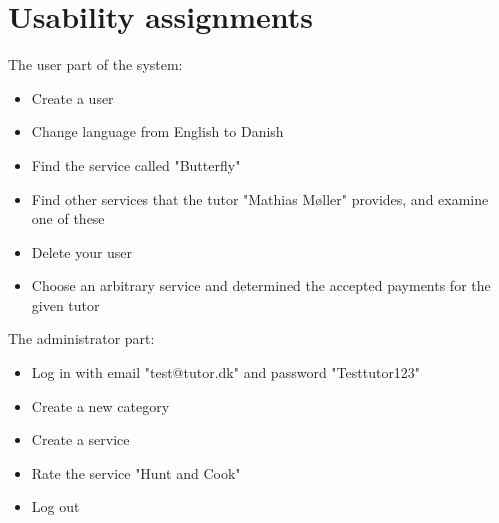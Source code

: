 \section{Usability assignments}\label{app:usability}
The user part of the system:
\begin{itemize}
    \item Create a user
    \item Change language from English to Danish
    \item Find the service called "Butterfly"
    \item Find other services that the tutor "Mathias Møller" provides, and examine one of these
    \item Delete your user
    \item Choose an arbitrary service and determined the accepted payments for the given tutor
\end{itemize}

The administrator part:
\begin{itemize}
    \item Log in with email "test@tutor.dk" and password "Testtutor123"
    \item Create a new category
    \item Create a service
    \item Rate the service "Hunt and Cook"
    \item Log out
\end{itemize}